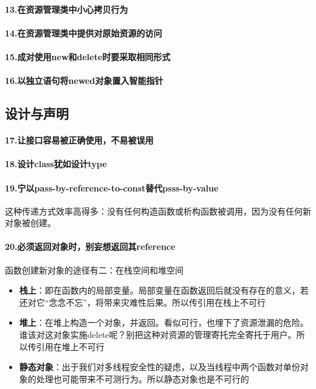 \documentclass[UTF8,a4paper,12pt]{ctexbook}
\begin{document}
		\paragraph{13.在资源管理类中小心拷贝行为}
		\paragraph{14.在资源管理类中提供对原始资源的访问}
		\paragraph{15.成对使用new和delete时要采取相同形式}
		\paragraph{16.以独立语句将newed对象置入智能指针}
	\subsection{设计与声明}
		\paragraph{17.让接口容易被正确使用，不易被误用}
		\paragraph{18.设计class犹如设计type}
		\paragraph{19.宁以pass-by-reference-to-const替代psss-by-value} 这种传递方式效率高得多：没有任何构造函数或析构函数被调用，因为没有任何新对象被创建。
		
		\paragraph{20.必须返回对象时，别妄想返回其reference}
			函数创建新对象的途径有二：在栈空间和堆空间
			
			\begin{itemize}
				\item \textbf{栈上}：即在函数内的局部变量。局部变量在函数返回后就没有存在的意义，若还对它“念念不忘”，将带来灾难性后果。所以传引用在栈上不可行
				\item \textbf{堆上}：在堆上构造一个对象，并返回。看似可行，也埋下了资源泄漏的危险。谁该对这对象实施delete呢？别把这种对资源的管理寄托完全寄托于用户。所以传引用在堆上不可行
				\item \textbf{静态对象}：出于我们对多线程安全性的疑虑，以及当线程中两个函数对单份对象的处理也可能带来不可测行为。所以静态对象也是不可行的
			\end{itemize}
			
\end{document}
